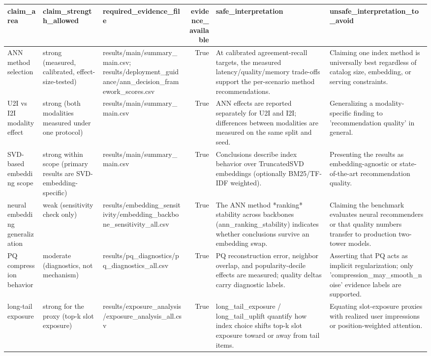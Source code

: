 \begin{tabular}{lllrll}
\toprule
claim_area & claim_strength_allowed & required_evidence_file & evidence_available & safe_interpretation & unsafe_interpretation_to_avoid \\
\midrule
ANN method selection & strong (measured, calibrated, effect-size-tested) & results/main/summary_main.csv; results/deployment_guidance/ann_decision_framework_scores.csv & True & At calibrated agreement-recall targets, the measured latency/quality/memory trade-offs support the per-scenario method recommendations. & Claiming one index method is universally best regardless of catalog size, embedding, or serving constraints. \\
U2I vs I2I modality effect & strong (both modalities measured under one protocol) & results/main/summary_main.csv & True & ANN effects are reported separately for U2I and I2I; differences between modalities are measured on the same split and seed. & Generalizing a modality-specific finding to 'recommendation quality' in general. \\
SVD-based embedding scope & strong within scope (primary results are SVD-embedding-specific) & results/main/summary_main.csv & True & Conclusions describe index behavior over TruncatedSVD embeddings (optionally BM25/TF-IDF weighted). & Presenting the results as embedding-agnostic or state-of-the-art recommendation quality. \\
neural embedding generalization & weak (sensitivity check only) & results/embedding_sensitivity/embedding_backbone_sensitivity_all.csv & True & The ANN method *ranking* stability across backbones (ann_ranking_stability) indicates whether conclusions survive an embedding swap. & Claiming the benchmark evaluates neural recommenders or that quality numbers transfer to production two-tower models. \\
PQ compression behavior & moderate (diagnostics, not mechanism) & results/pq_diagnostics/pq_diagnostics_all.csv & True & PQ reconstruction error, neighbor overlap, and popularity-decile effects are measured; quality deltas carry diagnostic labels. & Asserting that PQ acts as implicit regularization; only 'compression_may_smooth_noise' evidence labels are supported. \\
long-tail exposure & strong for the proxy (top-k slot exposure) & results/exposure_analysis/exposure_analysis_all.csv & True & long_tail_exposure / long_tail_uplift quantify how index choice shifts top-k slot exposure toward or away from tail items. & Equating slot-exposure proxies with realized user impressions or position-weighted attention. \\

\end{tabular}
